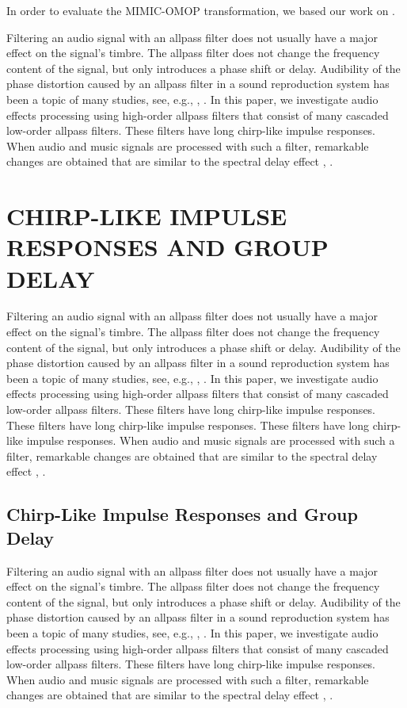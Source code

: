 \documentclass{aes2e}
\begin{document}
In order to evaluate the MIMIC-OMOP transformation, we based our work on
\cite{kahn}. 



Filtering an audio signal with an allpass filter does not usually have a major effect on the signal's timbre. The allpass filter does not change the frequency content of the signal, but only introduces a phase shift or delay. Audibility of the phase distortion caused by an allpass filter in a sound reproduction system has been a topic of many studies, see, e.g., \cite{DEK1}, \cite{DEK2}. In this paper, we investigate audio effects processing using high-order allpass filters that consist of many cascaded low-order allpass filters. These filters have long chirp-like impulse responses. When audio and music signals are processed with such a filter, remarkable changes are obtained that are similar to the spectral delay effect  \cite{DEK3}, \cite{DEK4}.

\section{CHIRP-LIKE IMPULSE RESPONSES AND GROUP DELAY}
Filtering an audio signal with an allpass filter does not usually have a major effect on the signal's timbre. The allpass filter does not change the frequency content of the signal, but only introduces a phase shift or delay. Audibility of the phase distortion caused by an allpass filter in a sound reproduction system has been a topic of many studies, see, e.g., \cite{DEK1}, \cite{DEK2}. In this paper, we investigate audio effects processing using high-order allpass filters that consist of many cascaded low-order allpass filters. These filters have long chirp-like impulse responses.  These filters have long chirp-like impulse responses.  These filters have long chirp-like impulse responses. When audio and music signals are processed with such a filter, remarkable changes are obtained that are similar to the spectral delay effect  \cite{DEK3}, \cite{DEK4}.

\subsection{Chirp-Like Impulse Responses and Group Delay}
Filtering an audio signal with an allpass filter does not usually have a major effect on the signal's timbre. The allpass filter does not change the frequency content of the signal, but only introduces a phase shift or delay. Audibility of the phase distortion caused by an allpass filter in a sound reproduction system has been a topic of many studies, see, e.g., \cite{DEK1}, \cite{DEK2}. In this paper, we investigate audio effects processing using high-order allpass filters that consist of many cascaded low-order allpass filters. These filters have long chirp-like impulse responses. When audio and music signals are processed with such a filter, remarkable changes are obtained that are similar to the spectral delay effect  \cite{DEK3}, \cite{DEK4}.
\end{document}
